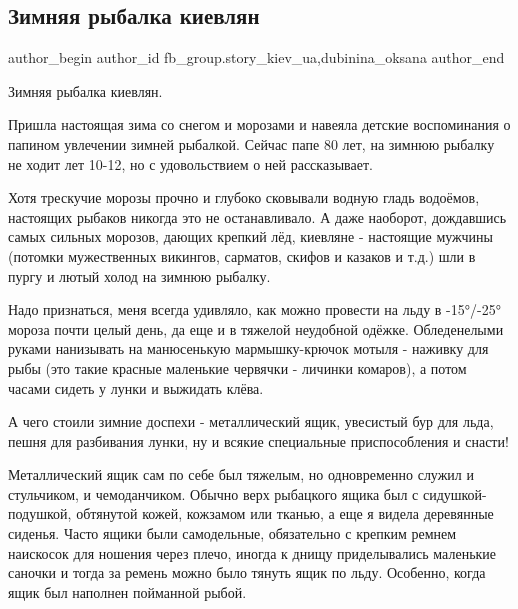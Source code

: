  
 
 
 
 
 
\subsection{Зимняя рыбалка киевлян}
\label{sec:11_01_2022.fb.fb_group.story_kiev_ua.3.zima_rybalka}
 
\ifcmt
 author_begin
   author_id fb_group.story_kiev_ua,dubinina_oksana
 author_end
\fi

Зимняя рыбалка киевлян.

Пришла настоящая зима со снегом и морозами и навеяла детские воспоминания о
папином увлечении зимней рыбалкой. Сейчас папе 80 лет, на зимнюю рыбалку не
ходит лет 10-12, но с удовольствием о ней рассказывает.


Хотя трескучие морозы прочно и глубоко сковывали водную гладь водоёмов,
настоящих рыбаков никогда это не останавливало. А даже наоборот, дождавшись
самых сильных морозов, дающих крепкий лёд, киевляне - настоящие мужчины
(потомки мужественных викингов, сарматов, скифов и казаков и т.д.) шли в пургу
и лютый холод на зимнюю рыбалку. 

Надо признаться, меня всегда удивляло, как можно провести на льду в -15°/-25°
мороза почти целый день, да еще и в тяжелой неудобной одёжке. Обледенелыми
руками нанизывать на манюсенькую мармышку-крючок мотыля - наживку для рыбы (это
такие красные маленькие червячки - личинки комаров), а потом часами сидеть у
лунки и выжидать клёва. 

А чего стоили зимние доспехи - металлический ящик, увесистый бур для льда,
пешня для разбивания лунки, ну и всякие специальные приспособления и снасти!

Металлический ящик сам по себе был тяжелым, но одновременно служил и
стульчиком, и чемоданчиком. Обычно верх рыбацкого ящика был с
сидушкой-подушкой, обтянутой кожей, кожзамом или тканью, а еще я видела
деревянные сиденья. Часто ящики были самодельные, обязательно с крепким ремнем
наискосок для ношения через плечо, иногда к днищу приделывались маленькие
саночки и тогда за ремень можно было тянуть ящик по льду. Особенно, когда ящик
был наполнен пойманной рыбой. 

